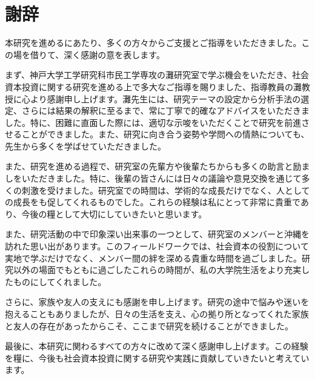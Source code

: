 \chapter*{謝辞}

本研究を進めるにあたり、多くの方々からご支援とご指導をいただきました。この場を借りて、深く感謝の意を表します。

まず、神戸大学工学研究科市民工学専攻の灘研究室で学ぶ機会をいただき、社会資本投資に関する研究を進める上で多大なご指導を賜りました、指導教員の灘教授に心より感謝申し上げます。灘先生には、研究テーマの設定から分析手法の選定、さらには結果の解釈に至るまで、常に丁寧で的確なアドバイスをいただきました。特に、困難に直面した際には、適切な示唆をいただくことで研究を前進させることができました。また、研究に向き合う姿勢や学問への情熱についても、先生から多くを学ばせていただきました。

また、研究を進める過程で、研究室の先輩方や後輩たちからも多くの助言と励ましをいただきました。特に、後輩の皆さんには日々の議論や意見交換を通じて多くの刺激を受けました。研究室での時間は、学術的な成長だけでなく、人としての成長をも促してくれるものでした。これらの経験は私にとって非常に貴重であり、今後の糧として大切にしていきたいと思います。

また、研究活動の中で印象深い出来事の一つとして、研究室のメンバーと沖縄を訪れた思い出があります。このフィールドワークでは、社会資本の役割について実地で学ぶだけでなく、メンバー間の絆を深める貴重な時間を過ごしました。研究以外の場面でもともに過ごしたこれらの時間が、私の大学院生活をより充実したものにしてくれました。

さらに、家族や友人の支えにも感謝を申し上げます。研究の途中で悩みや迷いを抱えることもありましたが、日々の生活を支え、心の拠り所となってくれた家族と友人の存在があったからこそ、ここまで研究を続けることができました。

最後に、本研究に関わるすべての方々に改めて深く感謝申し上げます。この経験を糧に、今後も社会資本投資に関する研究や実践に貢献していきたいと考えています。
